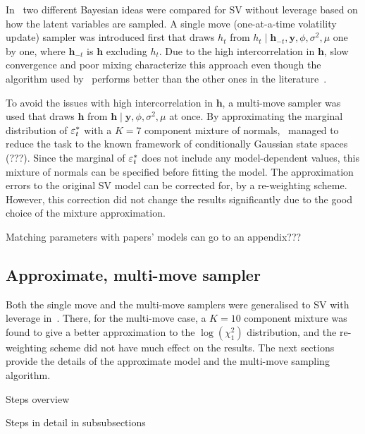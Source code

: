 In~\citet{Kim1998} two different Bayesian ideas were compared for SV without leverage based on how the latent variables are sampled.
A single move (one-at-a-time volatility update) sampler was introduced first that draws $h_t$ from $h_t\mid\bm{h}_{-t},\bm{y},\phi,\sigma^2,\mu$ one by one, where $\bm{h}_{-t}$ is $\bm{h}$ excluding $h_t$.
Due to the high intercorrelation in $\bm{h}$, slow convergence and poor mixing characterize this approach even though the algorithm used by~\citeauthor{Kim1998} performs better than the other ones in the literature~\citep{shephard1993fitting,jarquier1994bayesian,shephard1994comment,shephard1997likelihood,geweke1994bayesian}.

To avoid the issues with high intercorrelation in $\bm{h}$, a multi-move sampler was used that draws $\bm{h}$ from $\bm{h}\mid\bm{y},\phi,\sigma^2,\mu$ at once.
By approximating the marginal distribution of $\varepsilon_t^\ast$ with a $K=7$ component mixture of normals,~\citeauthor{Kim1998} managed to reduce the task to the known framework of conditionally Gaussian state spaces (???).
Since the marginal of $\varepsilon_t^\ast$ does not include any model-dependent values, this mixture of normals can be specified before fitting the model.
The approximation errors to the original SV model can be corrected for, by a re-weighting scheme.
However, this correction did not change the results significantly due to the good choice of the mixture approximation.

Matching parameters with papers' models can go to an appendix???

\subsection[Sampling algorithm]{Approximate, multi-move sampler}

Both the single move and the multi-move samplers were generalised to SV with leverage in~\citet{Omori2007}.
There, for the multi-move case, a $K=10$ component mixture was found to give a better approximation to the $\log(\chi^2_1)$ distribution, and the re-weighting scheme did not have much effect on the results.
The next sections provide the details of the approximate model and the multi-move sampling algorithm.

Steps overview

Steps in detail in subsubsections